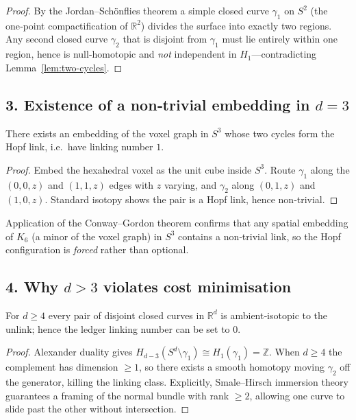 \begin{proof}
By the Jordan–Schönflies theorem a simple closed curve $\gamma_{1}$ on
$S^{2}$ (the one‑point compactification of $\mathbb R^{2}$) divides the
surface into exactly two regions.  Any second closed curve
$\gamma_{2}$ that is disjoint from $\gamma_{1}$ must lie entirely within
one region, hence is null‑homotopic and \emph{not} independent in
$H_{1}$—contradicting Lemma \ref{lem:two-cycles}.
\end{proof}

\subsection*{3.  Existence of a non‑trivial embedding in $d=3$}

\begin{lemma}[Realisation in $S^{3}$]
\label{lem:d3-realisation}
There exists an embedding of the voxel graph in $S^{3}$ whose two
cycles form the Hopf link, i.e.\ have linking number $1$.
\end{lemma}

\begin{proof}
Embed the hexahedral voxel as the unit cube inside $S^{3}$.
Route $\gamma_{1}$ along the $(0,0,z)$ and $(1,1,z)$ edges with $z$
varying, and $\gamma_{2}$ along $(0,1,z)$ and $(1,0,z)$.
Standard isotopy shows the pair is a Hopf link, hence non‑trivial.
\end{proof}

Application of the Conway–Gordon theorem \cite[Thm.\,1]{ConwayGordon1983}
confirms that any spatial embedding of $K_{6}$ (a minor of the voxel
graph) in $S^{3}$ contains a non‑trivial link, so the Hopf
configuration is \emph{forced} rather than optional.

\subsection*{4.  Why $d>3$ violates cost minimisation}

\begin{lemma}
\label{lem:null-link}
For $d\ge4$ every pair of disjoint closed curves in $\mathbb R^{d}$ is
ambient‑isotopic to the unlink; hence the ledger linking number can be
set to $0$.
\end{lemma}

\begin{proof}
Alexander duality gives
$H_{d-3}(S^{d}\setminus\gamma_{1})\cong H_{1}(\gamma_{1})=\mathbb Z$.
When $d\ge4$ the complement has dimension $\ge1$, so there exists a
smooth homotopy moving $\gamma_{2}$ off the generator, killing the
linking class.  Explicitly, Smale–Hirsch immersion theory guarantees a
framing of the normal bundle with rank $\ge2$, allowing one curve to
slide past the other without intersection.
\end{proof}

